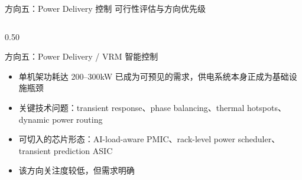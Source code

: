 \documentclass[aspectratio=169, 8pt, UTF8]{ctexbeamer}
\begin{document}
\begin{frame}{方向五：Power Delivery 控制 \quad 可行性评估与方向优先级}
  \begin{columns}[T]
    \begin{column}{0.50\textwidth}
      \begin{block}{方向五：Power Delivery / VRM 智能控制}
        \begin{itemize}
          \item 单机架功耗达 200--300kW 已成为可预见的需求，供电系统本身正成为基础设施瓶颈
          \item 关键技术问题：transient response、phase balancing、thermal hotspots、dynamic power routing
          \item 可切入的芯片形态：AI-load-aware PMIC、rack-level power scheduler、transient prediction ASIC
          \item 该方向关注度较低，但需求明确
        \end{itemize}
      \end{block}

      \vspace{6pt}


\end{column}
\end{columns}
\end{frame}
\end{document}
